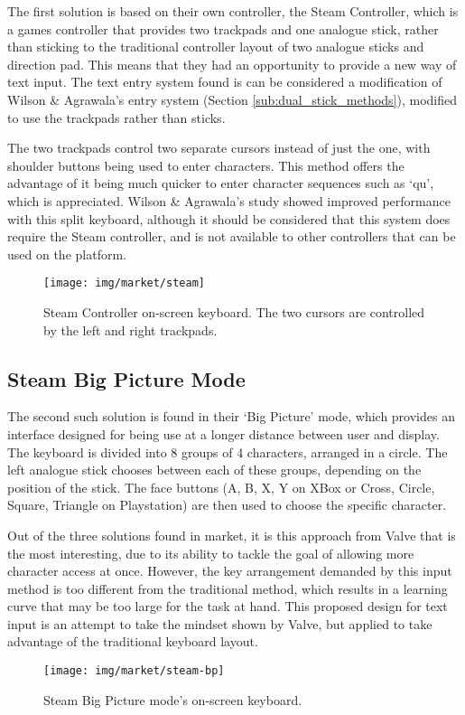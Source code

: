\documentclass[requirements.tex]{subfiles}
\begin{document}
The first solution is based on their own controller, the Steam Controller, which
is a games controller that provides two trackpads and one analogue stick, rather
than sticking to the traditional controller layout of two analogue sticks and
direction pad. This means that they had an opportunity to provide a new way of
text input. The text entry system found is can be considered a modification of
Wilson \& Agrawala's entry system (Section \ref{sub:dual_stick_methods}),
modified to use the trackpads rather than sticks.

The two trackpads control two separate cursors instead of just the one, with
shoulder buttons being used to enter characters. This method offers the
advantage of it being much quicker to enter character sequences such as `qu',
which is appreciated. Wilson \& Agrawala's study showed improved performance
with this split keyboard, although it should be considered that this system does
require the Steam controller, and is not available to other controllers that can
be used on the platform.

\begin{figure}[H]
	\centering
	\texttt{[image: img/market/steam]}
	\caption{Steam Controller on-screen keyboard. The two cursors are
	controlled by the left and right trackpads.}
\end{figure}

\subsection{Steam Big Picture Mode} %
\label{sub:steam_big_picture_mode}
The second such solution is found in their `Big Picture' mode, which provides an
interface designed for being use at a longer distance between user and display.
The keyboard is divided into 8 groups of 4 characters, arranged in a circle.
The left analogue stick chooses between each of these groups, depending on the
position of the stick. The face buttons (A, B, X, Y on XBox or Cross, Circle,
Square, Triangle on Playstation) are then used to choose the specific character.

Out of the three solutions found in market, it is this approach from Valve that
is the most interesting, due to its ability to tackle the goal of allowing
more character access at once. However, the key arrangement demanded by this
input method is too different from the traditional method, which results in a
learning curve that may be too large for the task at hand. This proposed design
for text input is an attempt to take the mindset shown by Valve, but applied to
take advantage of the traditional keyboard layout.

\begin{figure}[H]
	\centering
	\texttt{[image: img/market/steam-bp]}
	\caption{Steam Big Picture mode's on-screen keyboard.}
\end{figure}
\end{document}
